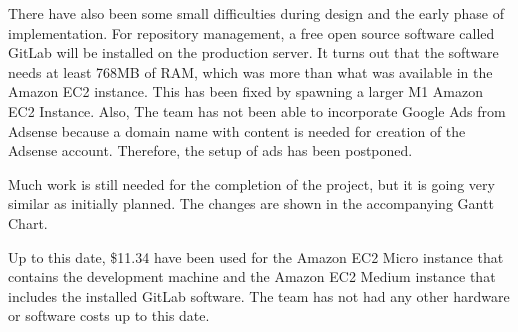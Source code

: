 There have also been some small difficulties during design and the early phase
of implementation. For repository management, a free open source software called
GitLab will be installed on the production server. It turns out that the
software needs at least 768MB of RAM, which was more than what was available in
the Amazon EC2 instance. This has been fixed by spawning a larger M1 Amazon EC2
Instance. Also, The team has not been able to incorporate Google Ads from
Adsense because a domain name with content is needed for creation of the Adsense
account. Therefore, the setup of ads has been postponed.

Much work is still needed for the completion of the project, but it is going
very similar as initially planned. The changes are shown in the accompanying
Gantt Chart. 

Up to this date, \$11.34 have been used for the Amazon EC2 Micro instance that
contains the development machine and the Amazon EC2 Medium instance that
includes the installed GitLab software. The team has not had any other hardware
or software costs up to this date.